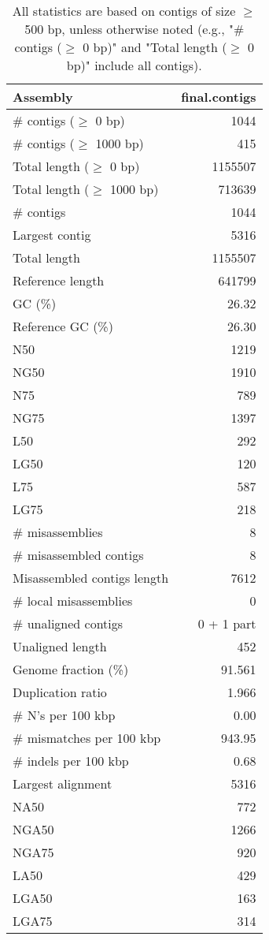 \documentclass[12pt,a4paper]{article}
\begin{document}
\begin{table}[ht]
\begin{center}
\caption{All statistics are based on contigs of size $\geq$ 500 bp, unless otherwise noted (e.g., "\# contigs ($\geq$ 0 bp)" and "Total length ($\geq$ 0 bp)" include all contigs).}
\begin{tabular}{|l*{1}{|r}|}
\hline
Assembly & final.contigs \\ \hline
\# contigs ($\geq$ 0 bp) & 1044 \\ \hline
\# contigs ($\geq$ 1000 bp) & 415 \\ \hline
Total length ($\geq$ 0 bp) & 1155507 \\ \hline
Total length ($\geq$ 1000 bp) & 713639 \\ \hline
\# contigs & 1044 \\ \hline
Largest contig & 5316 \\ \hline
Total length & 1155507 \\ \hline
Reference length & 641799 \\ \hline
GC (\%) & 26.32 \\ \hline
Reference GC (\%) & 26.30 \\ \hline
N50 & 1219 \\ \hline
NG50 & 1910 \\ \hline
N75 & 789 \\ \hline
NG75 & 1397 \\ \hline
L50 & 292 \\ \hline
LG50 & 120 \\ \hline
L75 & 587 \\ \hline
LG75 & 218 \\ \hline
\# misassemblies & 8 \\ \hline
\# misassembled contigs & 8 \\ \hline
Misassembled contigs length & 7612 \\ \hline
\# local misassemblies & 0 \\ \hline
\# unaligned contigs & 0 + 1 part \\ \hline
Unaligned length & 452 \\ \hline
Genome fraction (\%) & 91.561 \\ \hline
Duplication ratio & 1.966 \\ \hline
\# N's per 100 kbp & 0.00 \\ \hline
\# mismatches per 100 kbp & 943.95 \\ \hline
\# indels per 100 kbp & 0.68 \\ \hline
Largest alignment & 5316 \\ \hline
NA50 & 772 \\ \hline
NGA50 & 1266 \\ \hline
NGA75 & 920 \\ \hline
LA50 & 429 \\ \hline
LGA50 & 163 \\ \hline
LGA75 & 314 \\ \hline
\end{tabular}
\end{center}
\end{table}
\end{document}
